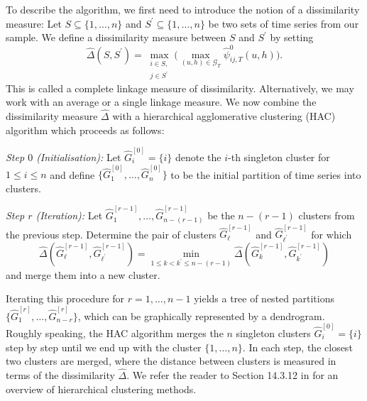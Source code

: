 \documentclass[12pt]{article}
\begin{document}
To describe the algorithm, we first need to introduce the notion of a dissimilarity measure: Let $S \subseteq \{1,\ldots, n\}$ and $S^\prime \subseteq \{1,\ldots, n\}$ be two sets of time series from our sample. We define a dissimilarity measure between $S$ and $S^\prime$ by setting 
\begin{equation}\label{dissimilarity}
\widehat{\Delta}(S,S^\prime) = \max_{\substack{i \in S, \\ j \in S^\prime}} \Big(\max_{(u, h) \in \mathcal{G}_T}\hat{\psi}^0_{ij, T}(u, h)\Big). 
\end{equation}
This is called a complete linkage measure of dissimilarity. Alternatively, we may work with an average or a single linkage measure. We now combine the dissimilarity measure $\widehat{\Delta}$ with a hierarchical agglomerative clustering (HAC) algorithm which proceeds as follows: 
\vspace{10pt}

\noindent \textit{Step $0$ (Initialisation):} Let $\widehat{G}_i^{[0]} = \{ i \}$ denote the $i$-th singleton cluster for $1 \le i \le n$ and define $\{\widehat{G}_1^{[0]},\ldots,\widehat{G}_n^{[0]} \}$ to be the initial partition of time series into clusters. 
\vspace{5pt}

\noindent \textit{Step $r$ (Iteration):} Let $\widehat{G}_1^{[r-1]},\ldots,\widehat{G}_{n-(r-1)}^{[r-1]}$ be the $n-(r-1)$ clusters from the previous step. Determine the pair of clusters $\widehat{G}_{\ell}^{[r-1]}$ and $\widehat{G}_{{\ell}^\prime}^{[r-1]}$ for which 
\[ \widehat{\Delta}(\widehat{G}_{\ell}^{[r-1]},\widehat{G}_{{\ell}^\prime}^{[r-1]}) = \min_{1 \le k < k^\prime \le n-(r-1)} \widehat{\Delta}(\widehat{G}_{k}^{[r-1]},\widehat{G}_{k^\prime}^{[r-1]}) \]  
and merge them into a new cluster. 
\vspace{10pt}

\noindent Iterating this procedure for $r = 1,\ldots, n-1$ yields a tree of nested partitions $\{\widehat{G}_1^{[r]},\ldots,\widehat{G}_{n-r}^{[r]}\}$, which can be graphically represented by a dendrogram. Roughly speaking, the HAC algorithm merges the $n$ singleton clusters $\widehat{G}_i^{[0]} = \{ i \}$ step by step until we end up with the cluster $\{1,\ldots, n\}$. In each step, the closest two clusters are merged, where the distance between clusters is measured in terms of the dissimilarity $\widehat{\Delta}$. We refer the reader to Section 14.3.12 in \cite{HastieTibshiraniFriedman2009} for an overview of hierarchical clustering methods. 
\end{document}
